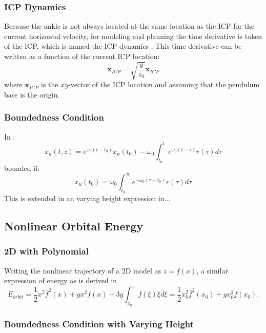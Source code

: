 \subsubsection{\ac{ICP} Dynamics}
Because the ankle is not always located at the same location as the \ac{ICP} for the current horizontal velocity, for modeling and planning the time derivative is taken of the \ac{ICP}, which is named the \ac{ICP} dynamics \cite{koolen2012capturability}. This time derivative can be written as a function of the current \ac{ICP} location:
\begin{equation}
\boldsymbol{\dot{x}}_{ICP}=\sqrt{ \frac{g}{z_0}}\boldsymbol{x}_{ICP} 
\label{eq:cp}
\end{equation}
where $\boldsymbol{x}_{ICP}$ is the $xy$-vector of the \ac{ICP} location and assuming that the pendulum base is the origin.

\subsubsection{Boundedness Condition}
In \cite{lanari2014boundedness}:
\begin{equation}
x_u(t,z) = e^{\omega_0(t-t_0)}x_u(t_0) -\omega_0 \int_{t_0}^t e^{\omega_0(t-\tau)}r(\tau)d \tau
\end{equation}
bounded if:
\begin{equation}
x_u(t_0) = \omega_0 \int_{t_0}^{\infty} e^{-\omega_0(\tau-t_0)}r(\tau)d \tau
\end{equation}
This is extended in an varying height expression in...

\subsection{Nonlinear Orbital Energy}\label{subsec:nonorbit}
\subsubsection{\ac{2D} with Polynomial}
Writing the nonlinear trajectory of a 2D model as $z=f(x)$, a similar expression of energy as \Elip  is derived in \cite{pratt2007derivation}
\begin{equation}
    E_{orbit}  = \frac{1}{2}\dot{x}^2\bar{f}^2(x)+gx^2f(x) - 3g\int_{x_0}^xf(\xi)\xi d\xi = \frac{1}{2}\dot{x}_0^2\bar{f}^2(x_0)+gx_0^2f(x_0).
\end{equation}
\subsubsection{Boundedness Condition with Varying Height}
\cite{caron}



